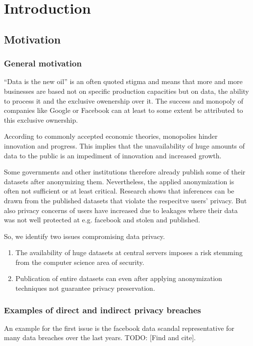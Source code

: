 
\chapter{Introduction}\label{chapter:introduction}
\section{Motivation}
\subsection{General motivation} \label{general-motivation}

“Data is the new oil” is an often quoted stigma and means that more and more businesses are
based not on specific production capacities but on data, the ability to process it and the exclusive owenership over it. The success and monopoly of
companies like Google or Facebook can at least to some extent be attributed to this exclusive ownership.

According to commonly accepted economic theories, monopolies hinder innovation and
progress. This implies that the unavailability of huge amounts of data to the public is an
impediment of innovation and increased growth.

Some governments and other institutions therefore already publish some of their datasets after anonymizing them. 
Nevertheless, the applied anonymization is often not sufficient or at least critical. Research shows that inferences can be drawn from the published datasets that violate the respecitve users' privacy.
But also privacy concerns of users have increased due to leakages where their data was not well protected at e.g. facebook and stolen and published.

So, we identify two issues compromising data privacy. 
\begin{enumerate}
  \item The availability of huge datasets at central servers imposes a risk stemming from the computer science area of security. 
  \item Publication of entire datasets can even after applying anonymization techniques not guarantee privacy preservation.
\end{enumerate}

\subsection{Examples of direct and indirect privacy breaches}
An example for the first issue is the facebook data scandal representative for many data breaches over the last years. TODO: [Find and cite].

